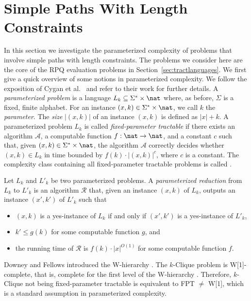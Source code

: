 \documentclass[a4paper,english]{lipics-v2016}
\theoremstyle{plain}
\begin{document}
 
\makeatletter{}\section{Simple Paths With Length Constraints}\label{sec:ParamCompl}


In this section we investigate the parameterized complexity of
problems that involve simple paths with length constraints. The
problems we consider here are the core of the RPQ evaluation problems
in Section~\ref{sec:tractlanguages}. 
We first give a quick overview of some notions in parameterized complexity.
We follow the exposition of Cygan et al.~\cite{paramAlgo} and refer to
their work for further details.  A \emph{parameterized problem} is a
language $L_k \subseteq \Sigma^* \times \nat$ where, as before,
$\Sigma$ is a fixed, finite alphabet.  For an instance $(x, k) \in
\Sigma^* \times \nat$, we call $k$ the \emph{parameter}. The
\emph{size} $|(x,k)|$ of an instance $(x,k)$ is defined as
$|x|+k$.           A parameterized problem $L_k$ is called
\emph{fixed-parameter tractable} if there exists an algorithm
$\mathcal{A}$, a computable function $f: \nat \rightarrow \nat$, and a
constant $c$ such that, given $(x,k) \in \Sigma^* \times \nat$, the
algorithm $\mathcal{A}$ correctly decides whether $(x,k) \in L_k$ in
time bounded by $f(k) \cdot |(x,k)|^c$, where $c$ is a constant. The
complexity class containing all fixed-parameter tractable problems is
called \fpt.

Let $L_k$ and $L'_{k}$ be two parameterized problems. A
\emph{parameterized reduction} from $L_k$ to $L'_{k}$ is an algorithm
$\mathcal{R}$ that, given an instance $(x,k)$ of $L_k$, outputs an
instance $(x',k')$ of $L'_{k}$ such that
\begin{itemize}
\item $(x,k)$ is a yes-instance of $L_k$ if and only if $(x',k')$ is a
  yes-instance of $L'_{k}$,
\item $k' \leq g(k)$ for some computable function $g$, and
\item the running time of $\mathcal{R}$ is $f(k)\cdot |x|^{O(1)}$ for
  some computable function $f$.
\end{itemize}
Downey and Fellows introduced the W-hierarchy
\cite{DowneySiam-95}. The $k$-Clique problem is W[1]-complete, that is,
complete for the first level of the W-hierarchy
\cite{DowneyTCS-95}. Therefore, $k$-Clique not being fixed-parameter
tractable is equivalent to FPT $\neq$ W[1], which is a standard
assumption in parameterized complexity.
\end{document}
